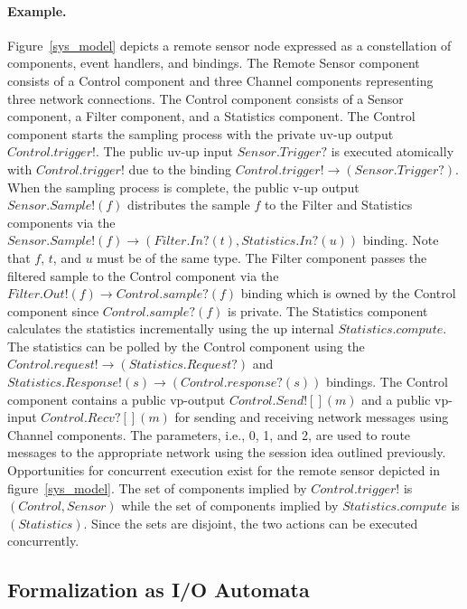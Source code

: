 \paragraph{Example.}
Figure~\ref{sys_model} depicts a remote sensor node expressed as a constellation of components, event handlers, and bindings.
The Remote Sensor component consists of a Control component and three Channel components representing three network connections.
The Control component consists of a Sensor component, a Filter component, and a Statistics component.
The Control component starts the sampling process with the private uv-up output $Control.trigger!$.
The public uv-up input $Sensor.Trigger?$ is executed atomically with $Control.trigger!$ due to the binding $Control.trigger! \to (Sensor.Trigger?)$.
When the sampling process is complete, the public v-up output $Sensor.Sample!(f)$ distributes the sample $f$ to the Filter and Statistics components via the $Sensor.Sample!(f) \to (Filter.In?(t), Statistics.In?(u))$ binding.
Note that $f$, $t$, and $u$ must be of the same type.
The Filter component passes the filtered sample to the Control component via the $Filter.Out!(f) \to Control.sample?(f)$ binding which is owned by the Control component since $Control.sample?(f)$ is private.
The Statistics component calculates the statistics incrementally using the up internal $Statistics.compute$.
The statistics can be polled by the Control component using the $Control.request! \to (Statistics.Request?)$ and $Statistics.Response!(s) \to (Control.response?(s))$ bindings.
The Control component contains a public vp-output $Control.Send![](m)$ and a public vp-input $Control.Recv?[](m)$ for sending and receiving network messages using Channel components.
The parameters, i.e., 0, 1, and 2, are used to route messages to the appropriate network using the session idea outlined previously.
Opportunities for concurrent execution exist for the remote sensor depicted in figure~\ref{sys_model}.
The set of components implied by $Control.trigger!$ is $(Control, Sensor)$ while the set of components implied by $Statistics.compute$ is $(Statistics)$.
Since the sets are disjoint, the two actions can be executed concurrently.

\subsection{Formalization as I/O Automata}

